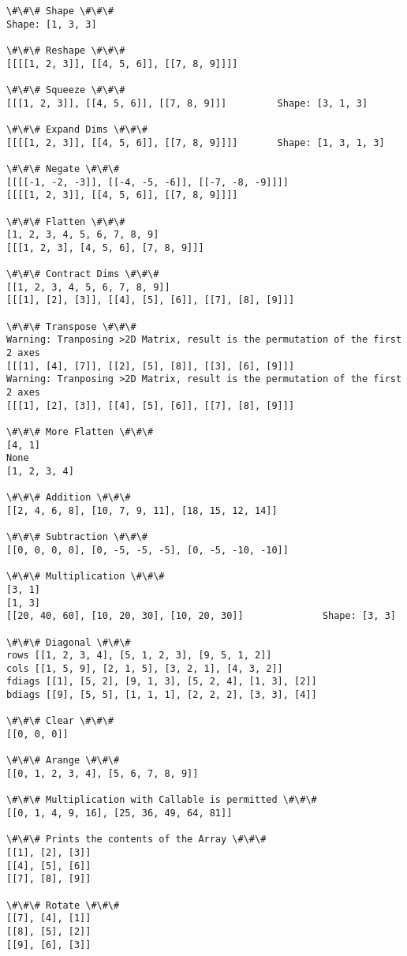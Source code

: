\documentclass[9pt]{article}
\begin{document}
    \begin{Verbatim}[commandchars=\\\{\}]
\#\#\# Shape \#\#\#
Shape: [1, 3, 3]

\#\#\# Reshape \#\#\#
[[[[1, 2, 3]], [[4, 5, 6]], [[7, 8, 9]]]]

\#\#\# Squeeze \#\#\#
[[[1, 2, 3]], [[4, 5, 6]], [[7, 8, 9]]]         Shape: [3, 1, 3]

\#\#\# Expand Dims \#\#\#
[[[[1, 2, 3]], [[4, 5, 6]], [[7, 8, 9]]]]       Shape: [1, 3, 1, 3]

\#\#\# Negate \#\#\#
[[[[-1, -2, -3]], [[-4, -5, -6]], [[-7, -8, -9]]]]
[[[[1, 2, 3]], [[4, 5, 6]], [[7, 8, 9]]]]

\#\#\# Flatten \#\#\#
[1, 2, 3, 4, 5, 6, 7, 8, 9]
[[[1, 2, 3], [4, 5, 6], [7, 8, 9]]]

\#\#\# Contract Dims \#\#\#
[[1, 2, 3, 4, 5, 6, 7, 8, 9]]
[[[1], [2], [3]], [[4], [5], [6]], [[7], [8], [9]]]

\#\#\# Transpose \#\#\#
Warning: Tranposing >2D Matrix, result is the permutation of the first 2 axes
[[[1], [4], [7]], [[2], [5], [8]], [[3], [6], [9]]]
Warning: Tranposing >2D Matrix, result is the permutation of the first 2 axes
[[[1], [2], [3]], [[4], [5], [6]], [[7], [8], [9]]]

\#\#\# More Flatten \#\#\#
[4, 1]
None
[1, 2, 3, 4]

\#\#\# Addition \#\#\#
[[2, 4, 6, 8], [10, 7, 9, 11], [18, 15, 12, 14]]

\#\#\# Subtraction \#\#\#
[[0, 0, 0, 0], [0, -5, -5, -5], [0, -5, -10, -10]]

\#\#\# Multiplication \#\#\#
[3, 1]
[1, 3]
[[20, 40, 60], [10, 20, 30], [10, 20, 30]]              Shape: [3, 3]

\#\#\# Diagonal \#\#\#
rows [[1, 2, 3, 4], [5, 1, 2, 3], [9, 5, 1, 2]]
cols [[1, 5, 9], [2, 1, 5], [3, 2, 1], [4, 3, 2]]
fdiags [[1], [5, 2], [9, 1, 3], [5, 2, 4], [1, 3], [2]]
bdiags [[9], [5, 5], [1, 1, 1], [2, 2, 2], [3, 3], [4]]

\#\#\# Clear \#\#\#
[[0, 0, 0]]

\#\#\# Arange \#\#\#
[[0, 1, 2, 3, 4], [5, 6, 7, 8, 9]]

\#\#\# Multiplication with Callable is permitted \#\#\#
[[0, 1, 4, 9, 16], [25, 36, 49, 64, 81]]

\#\#\# Prints the contents of the Array \#\#\#
[[1], [2], [3]]
[[4], [5], [6]]
[[7], [8], [9]]

\#\#\# Rotate \#\#\#
[[7], [4], [1]]
[[8], [5], [2]]
[[9], [6], [3]]


\end{Verbatim}
\end{document}
